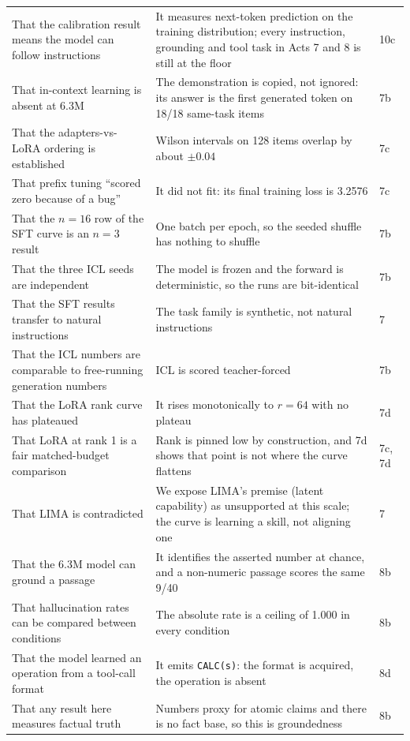 \documentclass[11pt,a4paper]{article}
\begin{document}
\begin{longtable}{L{8.0cm}L{4.4cm}L{1.4cm}}
That the calibration result means the model can follow instructions & It measures next-token prediction on the training distribution; every instruction, grounding and tool task in Acts 7 and 8 is still at the floor & 10c \\
That in-context learning is absent at 6.3M & The demonstration is copied, not ignored: its answer is the first generated token on 18/18 same-task items & 7b \\
That the adapters-vs-LoRA ordering is established & Wilson intervals on 128 items overlap by about $\pm 0.04$ & 7c \\
That prefix tuning ``scored zero because of a bug'' & It did not fit: its final training loss is 3.2576 & 7c \\
That the $n = 16$ row of the SFT curve is an $n = 3$ result & One batch per epoch, so the seeded shuffle has nothing to shuffle & 7b \\
That the three ICL seeds are independent & The model is frozen and the forward is deterministic, so the runs are bit-identical & 7b \\
That the SFT results transfer to natural instructions & The task family is synthetic, not natural instructions & 7 \\
That the ICL numbers are comparable to free-running generation numbers & ICL is scored teacher-forced & 7b \\
That the LoRA rank curve has plateaued & It rises monotonically to $r = 64$ with no plateau & 7d \\
That LoRA at rank 1 is a fair matched-budget comparison & Rank is pinned low by construction, and 7d shows that point is not where the curve flattens & 7c, 7d \\
That LIMA is contradicted & We expose LIMA's premise (latent capability) as unsupported at this scale; the curve is learning a skill, not aligning one & 7 \\
That the 6.3M model can ground a passage & It identifies the asserted number at chance, and a non-numeric passage scores the same 9/40 & 8b \\
That hallucination rates can be compared between conditions & The absolute rate is a ceiling of 1.000 in every condition & 8b \\
That the model learned an operation from a tool-call format & It emits \texttt{CALC(s)}: the format is acquired, the operation is absent & 8d \\
That any result here measures factual truth & Numbers proxy for atomic claims and there is no fact base, so this is groundedness & 8b \\

\end{longtable}
\end{document}
